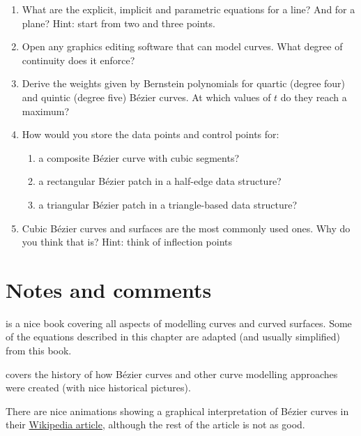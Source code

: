 \begin{enumerate}
	\item What are the explicit, implicit and parametric equations for a line? And for a plane? Hint: start from two and three points.
	\item Open any graphics editing software that can model curves. What degree of continuity does it enforce?
	\item Derive the weights given by Bernstein polynomials for quartic (degree four) and quintic (degree five) B\'ezier curves. At which values of \(t\) do they reach a maximum?
	\item How would you store the data points and control points for:
	\begin{enumerate}
		\item a composite B\'ezier curve with cubic segments?
		\item a rectangular B\'ezier patch in a half-edge data structure?
		\item a triangular B\'ezier patch in a triangle-based data structure?
	\end{enumerate}
	\item Cubic B\'ezier curves and surfaces are the most commonly used ones. Why do you think that is? Hint: think of inflection points
\end{enumerate}



%
\section{Notes and comments}

\citet{Salomon06} is a nice book covering all aspects of modelling curves and curved surfaces.
Some of the equations described in this chapter are adapted (and usually simplified) from this book.

\citet{Farin04} covers the history of how B\'ezier curves and other curve modelling approaches were created (with nice historical pictures).

There are nice animations showing a graphical interpretation of B\'ezier curves in their \href{https://en.wikipedia.org/wiki/Bézier_curve#Constructing_Bézier_curves}{Wikipedia article}, although the rest of the article is not as good.
